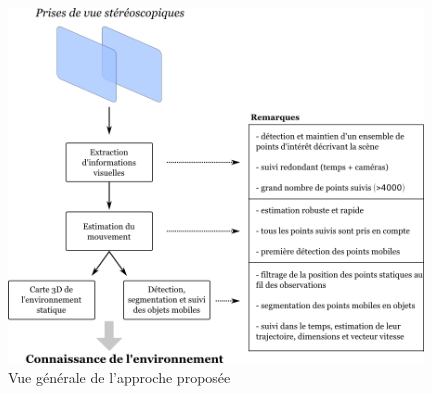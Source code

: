 \begin{figure} 
	\centering
	\includegraphics[width=0.98\textwidth]{Chapter2/graphics/overall_scheme_2.png}
	\caption{Vue générale de l'approche proposée}
	\label{fig:ch2_approche_proposée}
\end{figure}